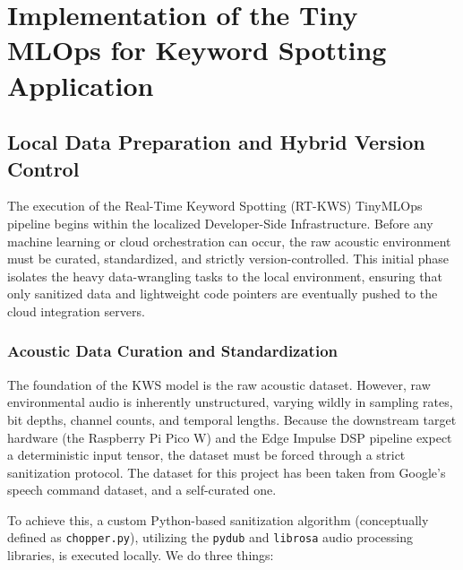 \documentclass[11pt,a4paper,openany]{book}
\begin{document}
\section{Implementation of the Tiny MLOps for Keyword Spotting Application}

\subsection{Local Data Preparation and Hybrid Version Control}
The execution of the Real-Time Keyword Spotting (RT-KWS) TinyMLOps pipeline begins within the localized Developer-Side Infrastructure. Before any machine learning or cloud orchestration can occur, the raw acoustic environment must be curated, standardized, and strictly version-controlled. This initial phase isolates the heavy data-wrangling tasks to the local environment, ensuring that only sanitized data and lightweight code pointers are eventually pushed to the cloud integration servers.

\subsubsection{Acoustic Data Curation and Standardization}
The foundation of the KWS model is the raw acoustic dataset. However, raw environmental audio is inherently unstructured, varying wildly in sampling rates, bit depths, channel counts, and temporal lengths. Because the downstream target hardware (the Raspberry Pi Pico W) and the Edge Impulse DSP pipeline expect a deterministic input tensor, the dataset must be forced through a strict sanitization protocol. The dataset for this project has been taken from Google's speech command dataset, and a self-curated one.

To achieve this, a custom Python-based sanitization algorithm (conceptually defined as \texttt{chopper.py}), utilizing the \texttt{pydub} and \texttt{librosa} audio processing libraries, is executed locally. We do three things:
\end{document}
